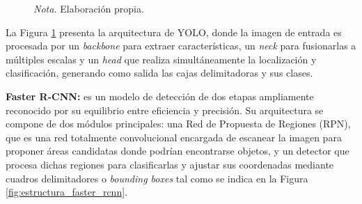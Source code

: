 \begin{figure}[h]
{%
    }
    
    \label{fig:estructura_yolo}
    
    \vspace{0.2cm}
    \caption*{\normalfont\normalsize\textit{Nota.} Elaboración propia.}
\end{figure}

La Figura \ref{fig:estructura_yolo} presenta la arquitectura de YOLO, donde la imagen de entrada es procesada por un \textit{backbone} para extraer características, un \textit{neck} para fusionarlas a múltiples escalas y un \textit{head} que realiza simultáneamente la localización y clasificación, generando como salida las cajas delimitadoras y sus clases.

\par\indent\textbullet\hspace{0.2cm} \textbf{Faster R-CNN:}  es un modelo de detección de dos etapas ampliamente reconocido por su equilibrio entre eficiencia y precisión. Su arquitectura se compone de dos módulos principales: una Red de Propuesta de Regiones (RPN), que es una red totalmente convolucional encargada de escanear la imagen para proponer áreas candidatas donde podrían encontrarse objetos, y un detector que procesa dichas regiones para clasificarlas y ajustar sus coordenadas mediante cuadros delimitadores o \textit{bounding boxes} \parencite{stiemer2023mbt3d} tal como se indica en la Figura \ref{fig:estructura_faster_rcnn}. \\


